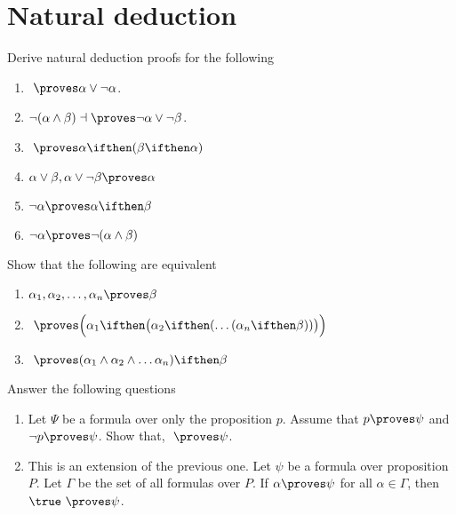 \section{Natural deduction}
\begin{exercise}
Derive natural deduction proofs for the following
\begin{enumerate}
\item \true $~\proves \alpha \vee \neg \alpha$.
\item $\neg (\alpha \wedge \beta) \dashv \proves \neg \alpha \vee \neg \beta$.
\item \true  $~\proves \alpha \ifthen (\beta \ifthen \alpha)$
\item $\alpha \vee \beta, \alpha \vee \neg \beta \proves \alpha$
\item $\neg \alpha \proves \alpha \ifthen \beta$
\item $\neg \alpha \proves \neg (\alpha \wedge \beta)$
\end{enumerate}
\end{exercise}


\begin{exercise}
Show that the following are equivalent
\begin{enumerate}
\item $\alpha_1, \alpha_2, \dots, \alpha_n \proves \beta$
\item \true $~\proves \Big(\alpha_1 \ifthen \big(\alpha_2 \ifthen (\dots (\alpha_n \ifthen \beta))\big)\Big)$
\item \true $~\proves (\alpha_1 \wedge \alpha_2 \wedge \dots \alpha_n) \ifthen \beta$
\end{enumerate}
\end{exercise}

\begin{exercise}
Answer the following questions
\begin{enumerate}
\item Let $\Psi$ be a formula over only the proposition $p$. Assume that $p \proves \psi$ and $\neg p \proves \psi$. Show that,  \true $~\proves \psi$.
\item This is an extension of the previous one. Let $\psi$ be a formula over proposition $P$. Let $\Gamma$ be the set of all formulas over $P$. If $\alpha \proves \psi$ for all $\alpha \in \Gamma$, then $\true ~\proves \psi$.
\end{enumerate}
\end{exercise}
